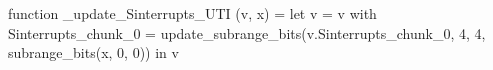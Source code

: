 function _update_Sinterrupts_UTI (v, x) = let v = { v with Sinterrupts_chunk_0 = update_subrange_bits(v.Sinterrupts_chunk_0, 4, 4, subrange_bits(x, 0, 0)) } in
  v

